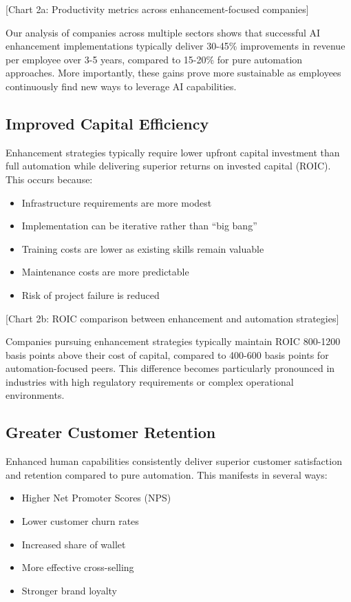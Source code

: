 \documentclass[
  Letterpaper,
]{scrbook}
\providecommand{\tightlist}{%
  \setlength{\itemsep}{0pt}\setlength{\parskip}{0pt}}\usepackage{longtable,booktabs,array}
\begin{document}
{[}Chart 2a: Productivity metrics across enhancement-focused
companies{]}

Our analysis of companies across multiple sectors shows that successful
AI enhancement implementations typically deliver 30-45\% improvements in
revenue per employee over 3-5 years, compared to 15-20\% for pure
automation approaches. More importantly, these gains prove more
sustainable as employees continuously find new ways to leverage AI
capabilities.

\subsection{Improved Capital
Efficiency}\label{improved-capital-efficiency}

Enhancement strategies typically require lower upfront capital
investment than full automation while delivering superior returns on
invested capital (ROIC). This occurs because:

\begin{itemize}
\tightlist
\item
  Infrastructure requirements are more modest
\item
  Implementation can be iterative rather than ``big bang''
\item
  Training costs are lower as existing skills remain valuable
\item
  Maintenance costs are more predictable
\item
  Risk of project failure is reduced
\end{itemize}

{[}Chart 2b: ROIC comparison between enhancement and automation
strategies{]}

Companies pursuing enhancement strategies typically maintain ROIC
800-1200 basis points above their cost of capital, compared to 400-600
basis points for automation-focused peers. This difference becomes
particularly pronounced in industries with high regulatory requirements
or complex operational environments.

\subsection{Greater Customer
Retention}\label{greater-customer-retention}

Enhanced human capabilities consistently deliver superior customer
satisfaction and retention compared to pure automation. This manifests
in several ways:

\begin{itemize}
\tightlist
\item
  Higher Net Promoter Scores (NPS)
\item
  Lower customer churn rates
\item
  Increased share of wallet
\item
  More effective cross-selling
\item
  Stronger brand loyalty
\end{itemize}
\end{document}
